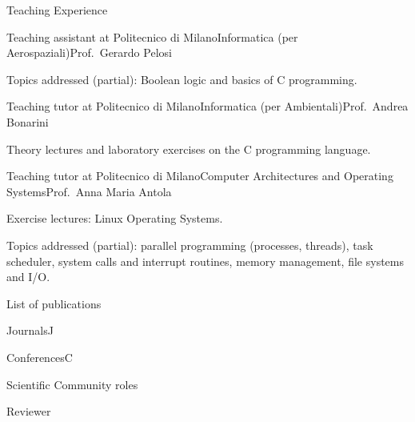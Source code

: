 \documentclass[
	a4paper, %
	11pt, %
]{tresume} %
\begin{document}
\begin{tSection}{Teaching Experience}
\begin{tSubsection}{Teaching assistant at Politecnico di Milano}{}{Informatica (per Aerospaziali)}{Prof.\ Gerardo Pelosi}
  \item Topics addressed (partial): Boolean logic and basics of C programming.
  \end{tSubsection}
  \begin{tSubsection}{Teaching tutor at Politecnico di Milano}{}{Informatica (per Ambientali)}{Prof.\ Andrea Bonarini}
\item Theory lectures and laboratory exercises on the C programming language.
\end{tSubsection}
\begin{tSubsection}{Teaching tutor at Politecnico di Milano}{}{Computer
    Architectures and Operating Systems}{Prof.\ Anna Maria Antola}
\item Exercise lectures: Linux Operating Systems.
\item Topics addressed (partial): parallel programming (processes, threads),
    task scheduler, system calls and interrupt routines, memory management, file
    systems and I/O.
\end{tSubsection}
\end{tSection}
\clearpage
\begin{tSection}{List of publications}
  \begin{tSubPublications}{Journals}{J}
  \item {}
  \end{tSubPublications}
  \begin{tSubPublications}{Conferences}{C}
  \item {}
  \item {}
  \end{tSubPublications}
\end{tSection}
\begin{tSection}{Scientific Community roles}
  \begin{tSubsection}{Reviewer}{}{}{}
  \item {}
  \item {}
  \item {}
  \end{tSubsection}
\end{tSection}
\end{document}
